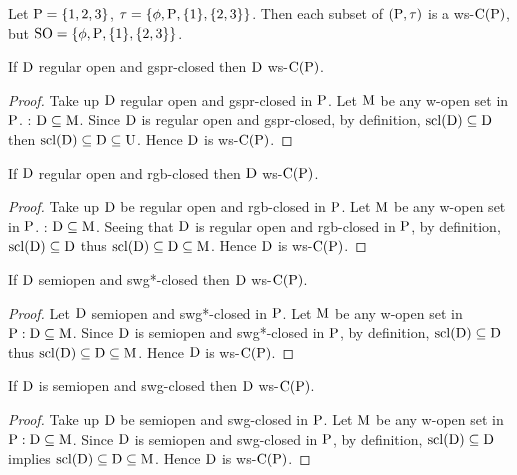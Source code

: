 \begin{exm}\label{exam2.2.34}
Let $\mathrm{P}  = \{1, 2, 3\}$, $\tau = \{\phi, \mathrm{P}, \{1\}, \{2, 3\}\}$. Then each subset of $(\mathrm{P},\tau)$ is a ws-$\mathrm{C}(\mathrm{P})$, but $\mathrm{SO}= \{\phi, \mathrm{P}, \{1\}, \{2, 3\}\}$.
\end{exm}

\begin{thm}\label{thm2.2.35}
If $\mathrm{D}$ regular open and gspr-closed then $\mathrm{D}$ ws-$\mathrm{C}(\mathrm{P})$.
\end{thm}

\begin{proof}
Take up $\mathrm{D}$ regular open and gspr-closed in $\mathrm{P}$. Let $\mathrm{M}$ be any w-open set in $\mathrm{P}$.  : $\mathrm{D}\subseteq \mathrm{M}$. Since $\mathrm{D}$ is regular open and gspr-closed, by definition, $\mathrm{scl}(\mathrm{D})\subseteq \mathrm{D}$ then $\mathrm{scl}(\mathrm{D})\subseteq \mathrm{D}\subseteq \mathrm{U}$. Hence $\mathrm{D}$ is ws-$\mathrm{C}(\mathrm{P})$.
\end{proof}

\begin{thm}\label{thm2.2.36}
If $\mathrm{D}$ regular open and rgb-closed then $\mathrm{D}$ ws-$\mathrm{C}(\mathrm{P})$.
\end{thm}

\begin{proof}
Take up $\mathrm{D}$ be regular open and rgb-closed in $\mathrm{P}$. Let $\mathrm{M}$ be any w-open set in $\mathrm{P}$. : $\mathrm{D}\subseteq \mathrm{M}$. Seeing that $\mathrm{D}$ is regular open and rgb-closed in $\mathrm{P}$, by definition, $\mathrm{scl}(\mathrm{D})\subseteq \mathrm{D}$ thus $\mathrm{scl}(\mathrm{D})\subseteq \mathrm{D}\subseteq \mathrm{M}$. Hence $\mathrm{D}$ is ws-$\mathrm{C}(\mathrm{P})$.
\end{proof}

\begin{thm}\label{thm2.2.37}
If $\mathrm{D}$ semiopen and swg*-closed then $\mathrm{D}$ ws-$\mathrm{C}(\mathrm{P})$.
\end{thm}

\begin{proof}
Let $\mathrm{D}$ semiopen and swg*-closed in $\mathrm{P}$. Let $\mathrm{M}$ be any w-open set in $\mathrm{P} : \mathrm{D}\subseteq \mathrm{M}$. Since $\mathrm{D}$ is semiopen and swg*-closed in $\mathrm{P}$, by definition, $\mathrm{scl}(\mathrm{D})\subseteq \mathrm{D}$ thus $\mathrm{scl}(\mathrm{D})\subseteq \mathrm{D}\subseteq \mathrm{M}$. Hence $\mathrm{D}$ is ws-$\mathrm{C}(\mathrm{P})$.
\end{proof}

\begin{thm}\label{thm2.2.38}
If $\mathrm{D}$ is semiopen and swg-closed then $\mathrm{D}$ ws-$\mathrm{C}(\mathrm{P})$.
\end{thm}

\begin{proof}
Take up $\mathrm{D}$ be semiopen and swg-closed in $\mathrm{P}$. Let $\mathrm{M}$ be any w-open set in $\mathrm{P} : \mathrm{D}\subseteq \mathrm{M}$. Since $\mathrm{D}$ is semiopen and swg-closed in $\mathrm{P}$, by definition, $\mathrm{scl}(\mathrm{D})\subseteq \mathrm{D}$ implies $\mathrm{scl}(\mathrm{D})\subseteq \mathrm{D}\subseteq \mathrm{M}$. Hence $\mathrm{D}$ is ws-$\mathrm{C}(\mathrm{P})$.
\end{proof}

